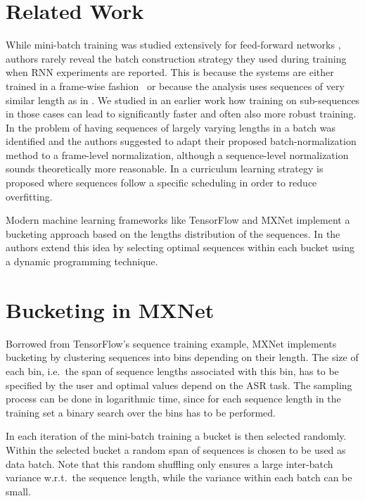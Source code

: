\documentclass{article}
\begin{document}
  \section{Related Work} \label{sec:related}
  	While mini-batch training was studied extensively for feed-forward networks \cite{Li16}, authors rarely reveal the batch construction strategy they used during training when 
  	RNN experiments are reported. This is because the systems are either trained in a frame-wise
  	fashion~\cite{2016arXiv161005256X} or because the analysis uses sequences of very similar length as in \cite{PascanuMB13}. We studied in an earlier work \cite{Doetsch14} how training on sub-sequences in those cases can lead to significantly faster and often also more robust training. 
  	In \cite{Laurent16} the problem of having sequences of largely varying lengths in a batch was identified and the authors
  	suggested to adapt their proposed batch-normalization method to a frame-level normalization, 
  	although a sequence-level normalization sounds theoretically more reasonable. In \cite{Bengio15} a curriculum learning strategy is proposed where sequences follow a specific scheduling in order to reduce overfitting.
  	
  	Modern machine learning frameworks like TensorFlow \cite{tensorflow} and 
  	MXNet \cite{mxnet} implement a bucketing approach based on the lengths distribution of the sequences. In \cite{Khomenko06} the authors extend this idea by selecting optimal sequences within each bucket using a dynamic programming technique.

  \section{Bucketing in MXNet} \label{sec:bucketing}
  Borrowed from TensorFlow's sequence training example, MXNet implements bucketing by 
  clustering sequences into bins depending on their length. The size of each bin, i.e.~the span of 
  sequence lengths associated with this bin, has to be specified by the user and optimal values 
  depend on the ASR task. The sampling process can be done in logarithmic time, since for each sequence length in the training set a binary search over the bins has to be performed. 
    
  In each iteration of the mini-batch training a bucket is then selected randomly. Within the selected bucket a random span of sequences is chosen to be used as data batch. Note that this random shuffling only ensures a large inter-batch variance w.r.t.~the sequence length, while the variance 
  within each batch can be small.
  
\end{document}
